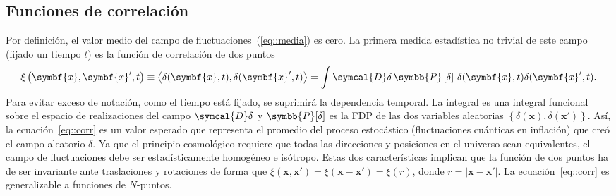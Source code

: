 \subsection{Funciones de correlación}
Por definición, el valor medio del campo de fluctuaciones~(\ref{eq::media}) es cero. La primera medida estadística no trivial de este campo (fijado un tiempo \(t\)) es la función de correlación de dos puntos
\begin{equation}
    \xi\left(\symbf{x},\symbf{x}',t\right)\equiv\left\langle\delta(\symbf{x},t),\delta(\symbf{x}',t)\right\rangle=\int\symcal{D}\delta\,\symbb{P}\left[\delta\right]\,\delta(\symbf{x},t)\delta(\symbf{x}',t).\label{eq::corr}
\end{equation}
Para evitar exceso de notación, como el tiempo está fijado, se suprimirá la dependencia temporal. La integral es una integral funcional sobre el espacio de realizaciones del campo \(\symcal{D}\delta\) y \(\symbb{P}[\delta]\) es la FDP de las dos variables aleatorias \(\left\lbrace\delta(\symbf{x}),\delta(\symbf{x}')\right\rbrace\). Así, la ecuación~\ref{eq::corr} es un valor esperado que representa el promedio del proceso estocástico (fluctuaciones cuánticas en inflación) que creó el campo aleatorio \(\delta\). Ya que el principio cosmológico requiere que todas las direcciones y posiciones en el universo sean equivalentes, el campo de fluctuaciones debe ser estadísticamente homogéneo e isótropo. Estas dos características implican que la función de dos puntos ha de ser invariante ante traslaciones y rotaciones de forma que \(\xi(\symbf{x},\symbf{x}')=\xi(\symbf{x}-\symbf{x}')=\xi(r)\), donde \(r=\left|\symbf{x}-\symbf{x}'\right|\). La ecuación~\ref{eq::corr} es generalizable a funciones de \(N\)-puntos.

